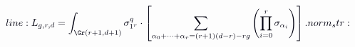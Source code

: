 \documentclass[12pt]{article}
\begin{document}
\makeatletter
\renewcommand*{\@textcolor}[3]{%
  \protect\leavevmode
  \begingroup
    \color#1{#2}#3%
  \endgroup
}
\makeatother
\begin{displaymath}
\mathcolor[RGB]{0,0,15}{line:
L_{g,r,d}=\int_{\Gr(r+1,d+1)}\sigma_{1^r}^q\cdot\left[\sum_{\alpha_0+\cdots+\alpha_r=(r+1)(d-r)-rg}\left(\prod_{i=0}^r\sigma_{\alpha_i}\right)\right].

norm_str:}
\end{displaymath}
\end{document}
